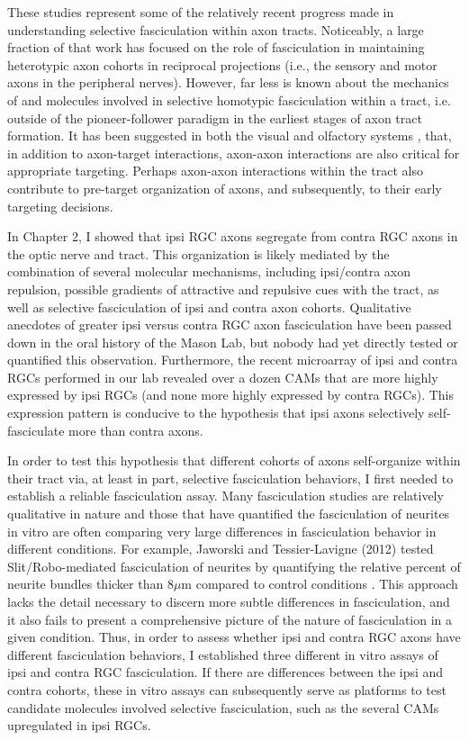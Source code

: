 These studies represent some of the relatively recent progress made in understanding selective fasciculation within axon tracts.
Noticeably, a large fraction of that work has focused on the role of fasciculation in maintaining heterotypic axon cohorts in reciprocal projections (i.e., the sensory and motor axons in the peripheral nerves).
However, far less is known about the mechanics of and molecules involved in selective homotypic fasciculation within a tract, i.e. outside of the pioneer-follower paradigm in the earliest stages of axon tract formation.
It has been suggested in both the visual \cite{weth2014chemoaffinity} and olfactory systems \cite{ebrahimi2000olfactory,imai2011axon}, that, in addition to axon-target interactions, axon-axon interactions are also critical for appropriate targeting.
Perhaps axon-axon interactions within the tract also contribute to pre-target organization of axons, and subsequently, to their early targeting decisions.

In Chapter 2, I showed that ipsi RGC axons segregate from contra RGC axons in the optic nerve and tract.
This organization is likely mediated by the combination of several molecular mechanisms, including ipsi/contra axon repulsion, possible gradients of attractive and repulsive cues with the tract, as well as selective fasciculation of ipsi and contra axon cohorts.
Qualitative anecdotes of greater ipsi versus contra RGC axon fasciculation have been passed down in the oral history of the Mason Lab, but nobody had yet directly tested or quantified this observation.
Furthermore, the recent microarray of ipsi and contra RGCs performed in our lab revealed over a dozen CAMs that are more highly expressed by ipsi RGCs (and none more highly expressed by contra RGCs).
This expression pattern is conducive to the hypothesis that ipsi axons selectively self-fasciculate more than contra axons.

In order to test this hypothesis that different cohorts of axons self-organize within their tract via, at least in part, selective fasciculation behaviors, I first needed to establish a reliable fasciculation assay.
Many fasciculation studies are relatively qualitative in nature and those that have quantified the fasciculation of neurites in vitro are often comparing very large differences in fasciculation behavior in different conditions.
For example, Jaworski and Tessier-Lavigne (2012) tested Slit/Robo-mediated fasciculation of neurites by quantifying the relative percent of neurite bundles thicker than 8$\mu$m compared to control conditions \cite{jaworski2012autocrine}.
This approach lacks the detail necessary to discern more subtle differences in fasciculation, and it also fails to present a comprehensive picture of the nature of fasciculation in a given condition. 
Thus, in order to assess whether ipsi and contra RGC axons have different fasciculation behaviors, I established three different in vitro assays of ipsi and contra RGC fasciculation.
If there are differences between the ipsi and contra cohorts, these in vitro assays can subsequently serve as platforms to test candidate molecules involved selective fasciculation, such as the several CAMs upregulated in ipsi RGCs.

